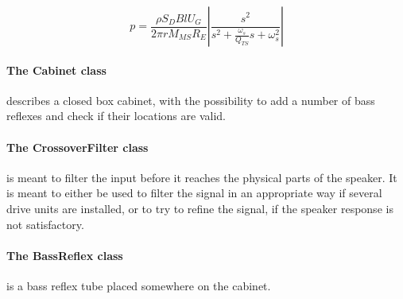 \begin{equation}
	p = \frac{\rho S_D B l U_G}{2\pi r M_{MS} R_E}\left|\frac{s^2}{s^2 + \frac{\omega_s}{Q_{TS}}s+\omega_s^2}\right|
	\label{eq:transdriveunit}
\end{equation}

\paragraph{The Cabinet class} describes a closed box cabinet, with the possibility to add a number of bass reflexes and check if their locations are valid.

\paragraph{The CrossoverFilter class} is meant to filter the input before it reaches the physical parts of the speaker.
It is meant to either be used to filter the signal in an appropriate way if several drive units are installed, or to try to refine the signal, if the speaker response is not satisfactory.

\paragraph{The BassReflex class} is a bass reflex tube placed somewhere on the cabinet.